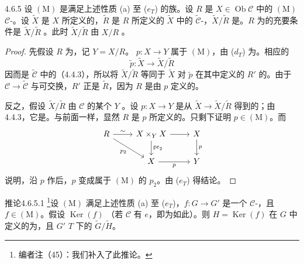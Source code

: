\begin{SGAresult}{}{4.6.5}
设 $(\mathrm M)$ 是满足上述性质 (a) 至 ($e_T$) 的族。设 $R$ 是 $X\in\operatorname{Ob}\mathcal C$ 中的 $(\mathrm M)$  $\mathcal C$-。设 $\widetilde X$ 是 $X$ 所定义的，$\widetilde R$ 是 $R$ 所定义的 $\widetilde X$ 中的 $\widetilde{\mathcal C}$-，$\widetilde X/\widetilde R$ 是。$R$ 为的充要条件是 $\widetilde X/\widetilde R$ 。此时 $\widetilde X/\widetilde R$ 由 $X/R$ 。
\end{SGAresult}
\begin{proof}
先假设 $R$ 为，记 $Y=X/R$。 $p:X\to Y$ 属于 $(\mathrm M)$，由 ($d_T$) 为。相应的
\[
\widetilde p:\widetilde X\longrightarrow\widetilde X/\widetilde R
\]
因而是 $\widetilde{\mathcal C}$ 中的（4.4.3），所以将 $\widetilde X/\widetilde R$ 等同于 $\widetilde X$ 对 $\widetilde p$ 在其中定义的 $R'$ 的。由于 $\mathcal C\to\widetilde{\mathcal C}$ 与可交换，$R'$ 正是 $\widetilde R$，因为 $R$ 是由 $p$ 定义的。

反之，假设 $\widetilde X/\widetilde R$ 由 $\mathcal C$ 的某个 $Y$ 。设 $p:X\to Y$ 是从 $\widetilde X\to\widetilde X/\widetilde R$ 得到的；由 4.4.3，它是。与前面一样，显然 $R$ 是 $p$ 所定义的。只剩下证明 $p\in(\mathrm M)$。而
\[
\begin{tikzcd}
R\arrow[r,"\sim"]\arrow[dr,"p_2"']&X\times_Y X\arrow[r]\arrow[d,"\operatorname{pr}_2"]&X\arrow[d,"p"]\\
&X\arrow[r,"p"']&Y
\end{tikzcd}
\]
说明，沿 $p$ 作后，$p$ 变成属于 $(\mathrm M)$ 的 $p_2$。由 ($e_T$) 得结论。
\end{proof}
\begin{SGAresult}{推论}{4.6.5.1}
\footnote{编者注（45）：我们补入了此推论。}设 $(\mathrm M)$ 满足上述性质 (a) 至 ($e_T$)，$f:G\to G'$ 是一个 $\mathcal C$-，且 $f\in(\mathrm M)$。假设 $\operatorname{Ker}(f)$ （若 $\mathcal C$ 有 $e$，即为如此）。则 $H=\operatorname{Ker}(f)$ 在 $G$ 中定义的为，且 $G'$  $T$ 下的 $\widetilde G/\widetilde H$。
\end{SGAresult}

